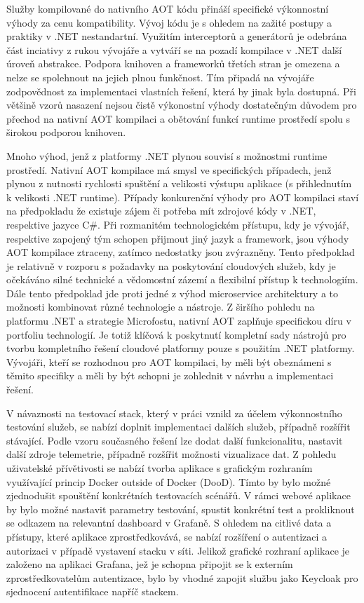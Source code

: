 Služby kompilované do nativního AOT kódu přináší specifické výkonnostní výhody za cenu kompatibility. Vývoj kódu je s ohledem na zažité postupy a praktiky v .NET nestandartní. Využitím interceptorů a generátorů je odebrána část inciativy z rukou vývojáře a vytváří se na pozadí kompilace v .NET další úroveň abstrakce. Podpora knihoven a frameworků třetích stran je omezena a nelze se spolehnout na jejich plnou funkčnost. Tím připadá na vývojáře zodpovědnost za implementaci vlastních řešení, která by jinak byla dostupná. Při většině vzorů nasazení nejsou čistě výkonostní výhody dostatečným důvodem pro přechod na nativní AOT kompilaci a obětování funkcí runtime prostředí spolu s širokou podporou knihoven.

Mnoho výhod, jenž z platformy .NET plynou souvisí s možnostmi runtime prostředí. Nativní AOT kompilace má smysl ve specifických případech, jenž plynou z nutnosti rychlosti spuštění a velikosti výstupu aplikace (s přihlednutím k velikosti .NET runtime). Případy konkurenční výhody pro AOT kompilaci staví na předpokladu že existuje zájem či potřeba mít zdrojové kódy v .NET, respektive jazyce C\#. Při rozmanitém technologickém přístupu, kdy je vývojář, respektive zapojený tým schopen přijmout jiný jazyk a framework, jsou výhody AOT kompilace ztraceny, zatímco nedostatky jsou zvýrazněny. Tento předpoklad je relativně v rozporu s požadavky na poskytování cloudových služeb, kdy je očekáváno silné technické a vědomostní zázemí a flexibilní přístup k technologiím. Dále tento předpoklad jde proti jedné z výhod microservice architektury a to možnosti kombinovat různé technologie a nástroje. Z širšího pohledu na platformu .NET a strategie Microfostu, nativní AOT zaplňuje specifickou díru v portfoliu technologií. Je totiž klíčová k poskytnutí kompletní sady nástrojů pro tvorbu kompletního řešení cloudové platformy pouze s použitím .NET platformy. Vývojáři, kteří se rozhodnou pro AOT kompilaci, by měli být obeznámeni s těmito specifiky a měli by být schopni je zohlednit v návrhu a implementaci řešení.

V návaznosti na testovací stack, který v práci vznikl za účelem výkonnostního testování služeb, se nabízí doplnit implementaci dalších služeb, případně rozšířit stávající. Podle vzoru současného řešení lze dodat další funkcionalitu, nastavit další zdroje telemetrie, případně rozšířit možnosti vizualizace dat. Z pohledu uživatelské přívětivosti se nabízí tvorba aplikace s grafickým rozhraním využívající princip Docker outside of Docker (DooD). Tímto by bylo možné zjednodušit spouštění konkrétních testovacích scénářů. V rámci webové aplikace by bylo možné nastavit parametry testování, spustit konkrétní test a prokliknout se odkazem na relevantní dashboard v Grafaně. S ohledem na citlivé data a přístupy, které aplikace zprostředkovává, se nabízí rozšíření o autentizaci a autorizaci v případě vystavení stacku v síti. Jelikož grafické rozhraní aplikace je založeno na aplikaci Grafana, jež je schopna připojit se k externím zprostředkovatelům autentizace, bylo by vhodné zapojit službu jako Keycloak pro sjednocení autentifikace napříč stackem.

